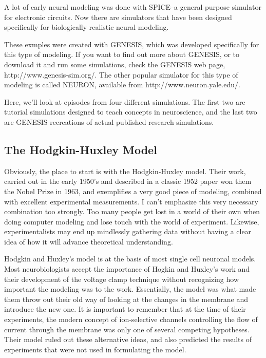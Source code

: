 \documentclass[12pt]{article}
\begin{document}
A lot of early neural modeling was done with SPICE--a general purpose simulator for electronic circuits. Now there are simulators that have been designed specifically for biologically realistic neural modeling.

These exmples were created with GENESIS, which was developed specifically for this type of modeling. If you want to find out more about GENESIS, or to download it and run some simulations, check the GENESIS web page, http://www.genesis-sim.org/. The other popular simulator for this type of modeling is called NEURON, available from http://www.neuron.yale.edu/.

Here, we'll look at episodes from four different simulations. The first two are tutorial simulations designed to teach concepts in neuroscience, and the last two are GENESIS recreations of actual published research simulations.

\subsection*{The Hodgkin-Huxley Model}

Obviously, the place to start is with the Hodgkin-Huxley model. Their work, carried out in the early 1950's and described in a classic 1952 paper won them the Nobel Prize in 1963, and exemplifies a very good piece of modeling, combined with excellent experimental measurements. I can't emphasize this very necessary combination too strongly. Too many people get lost in a world of their own when doing computer modeling and lose touch with the world of experiment. Likewise, experimentalists may end up mindlessly gathering data without having a clear idea of how it will advance theoretical understanding.

Hodgkin and Huxley's model is at the basis of most single cell neuronal models. Most neurobiologists accept the importance of Hogkin and Huxley's work and their development of the voltage clamp technique without recognizing how important the modeling was to the work. Essentially, the model was what made them throw out their old way of looking at the changes in the membrane and introduce the new one. It is important to remember that at the time of their experiments, the modern concept of ion-selective channels controlling the flow of current through the membrane was only one of several competing hypotheses. Their model ruled out these alternative ideas, and also predicted the results of experiments that were not used in formulating the model.
\end{document}
